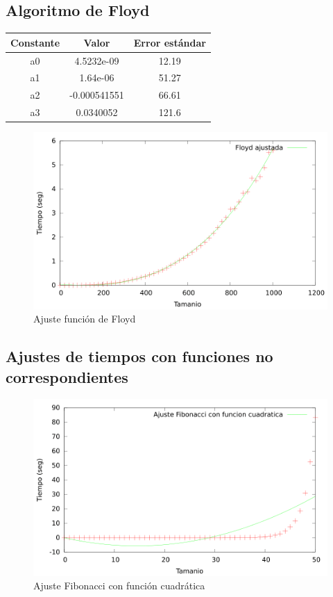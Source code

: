 \documentclass{article}
\begin{document}
	\subsection{Algoritmo de Floyd}
	
	
	\begin{longtable}{|c|c|c|}
		\hline
		Constante		& Valor			& Error estándar	\\ \hline
		a0              & 4.5232e-09	& 12.19 \\ \hline
		a1              & 1.64e-06		& 51.27 \\ \hline
		a2              & -0.000541551	& 66.61 \\ \hline
		a3              & 0.0340052		& 121.6 \\ \hline
	\end{longtable}
	
	\begin{figure}[H]
		\centering
		\includegraphics[totalheight=8cm]{img/Floyd_ajustada}
		\caption{Ajuste función de Floyd}
		\label{fig:Floyd_ajustada}
	\end{figure}
	
	\subsection{Ajustes de tiempos con funciones no correspondientes}
	
	\begin{figure}[H]
		\centering
		\includegraphics[totalheight=8cm]{img/ajusteFibonacci_cuadratico}
		\caption{Ajuste Fibonacci con función cuadrática}
		\label{fig:ajusteFibonacci_cuadratico}
	\end{figure}
	
\end{document}
